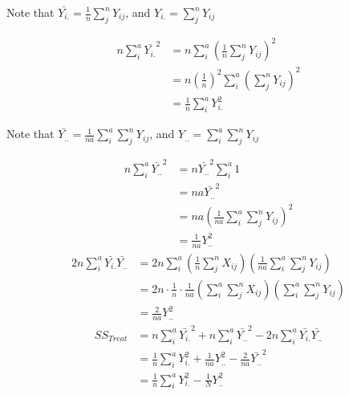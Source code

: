 \documentclass[11pt,letterpaper]{article}
\begin{document}
\noindent Note that $\bar{Y_{i.}} = \frac{1}{n} \sum_j^n Y_{ij}$, and $Y_{i.} = \sum_j^n Y_{ij}$ 

\begin{align*}
n \sum_{i}^a \bar{Y_{i.}}^2 &= n \sum_{i}^a (\frac{1}{n} \sum_j^n Y_{ij})^2 \\
&= n (\frac{1}{n})^2 \sum_{i}^a (\sum_j^n Y_{ij})^2 \\
&= \frac{1}{n} \sum_{i}^a Y_{i.}^2
\end{align*}

\noindent Note that $\bar{Y_{..}} = \frac{1}{na} \sum_i^a \sum_j^n Y_{ij}$, and $Y_{..} = \sum_i^a \sum_j^n Y_{ij}$ 

\begin{align*}
n \sum_{i}^a \bar{Y_{..}}^2 &= n \bar{Y_{..}}^2 \sum_i^a 1 \\
&= na \bar{Y_{..}}^2 \\
&= na  (\frac{1}{na} \sum_i^a \sum_j^n Y_{ij})^2 \\
&= \frac{1}{na} Y_{..}^2
\end{align*}
\begin{align*}
2 n \sum_{i}^a\bar{Y_{i.}} \bar{Y_{..}}  &= 2 n \sum_i^a (\frac{1}{n} \sum_j^n X_{ij}) (\frac{1}{na} \sum_i^a \sum_j^n Y_{ij}) \\
&= 2n \cdot \frac{1}{n} \cdot \frac{1}{na} (\sum_i^a \sum_j^n X_{ij}) ( \sum_i^a \sum_j^n Y_{ij}) \\
&= \frac{2}{na} Y_{..}^2
\end{align*}
\begin{align*}
SS_{Treat} &= n \sum_{i}^a \bar{Y_{i.}}^2 + n \sum_{i}^a \bar{Y_{..}}^2 - 2 n \sum_{i}^a\bar{Y_{i.}} \bar{Y_{..}}  \\
&=  \frac{1}{n} \sum_{i}^a Y_{i.}^2 + \frac{1}{na} Y_{..}^2 - \frac{2}{na} \bar{Y_{..}}^2 \\
&= \frac{1}{n} \sum_{i}^a Y_{i.}^2 - \frac{1}{N}Y_{..}^2
\end{align*}
\end{document}
